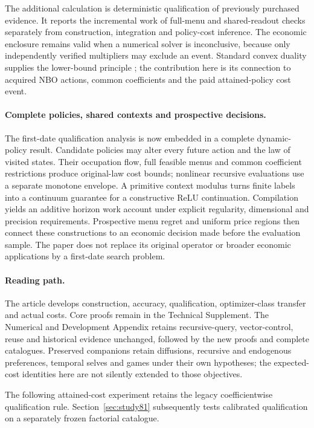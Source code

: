 \documentclass[ecta,nameyear,draft]{econsocart}
\begin{document}
The additional calculation is deterministic qualification of previously purchased evidence. It reports the incremental work of full-menu and shared-readout checks separately from construction, integration and policy-cost inference. The economic enclosure remains valid when a numerical solver is inconclusive, because only independently verified multipliers may exclude an event. Standard convex duality supplies the lower-bound principle \citep{boyd2004}; the contribution here is its connection to acquired NBO actions, common coefficients and the paid attained-policy cost event.

\paragraph{Complete policies, shared contexts and prospective decisions.}
The first-date qualification analysis is now embedded in a complete dynamic-policy result. Candidate policies may alter every future action and the law of visited states. Their occupation flow, full feasible menus and common coefficient restrictions produce original-law cost bounds; nonlinear recursive evaluations use a separate monotone envelope. A primitive context modulus turns finite labels into a continuum guarantee for a constructive ReLU continuation. Compilation yields an additive horizon work account under explicit regularity, dimensional and precision requirements. Prospective menu regret and uniform price regions then connect these constructions to an economic decision made before the evaluation sample. The paper does not replace its original operator or broader economic applications by a first-date search problem.

\paragraph{Reading path.}
The article develops construction, accuracy, qualification, optimizer-class transfer and actual costs. Core proofs remain in the Technical Supplement. The Numerical and Development Appendix retains recursive-query, vector-control, reuse and historical evidence unchanged, followed by the new proofs and complete catalogues. Preserved companions retain diffusions, recursive and endogenous preferences, temporal selves and games under their own hypotheses; the expected-cost identities here are not silently extended to those objectives.














\noindent The following attained-cost experiment retains the legacy coefficientwise qualification rule. Section~\ref{sec:study81} subsequently tests calibrated qualification on a separately frozen factorial catalogue.






\end{document}
